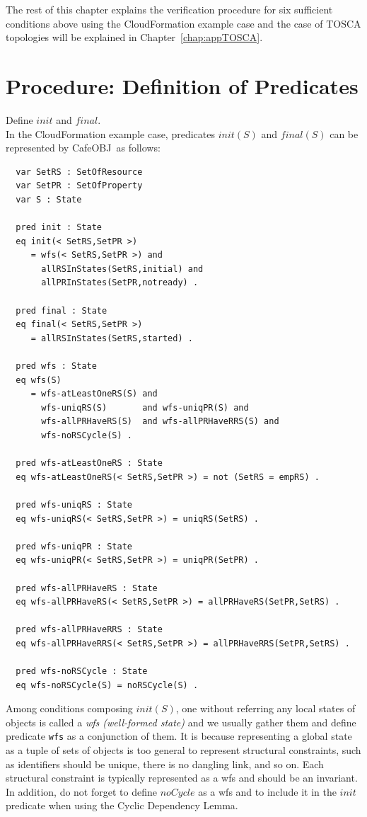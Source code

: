 \documentclass[12pt]{report}
\newcommand{\cafeobj}{{\sf CafeOBJ}~}
\begin{document}
The rest of this chapter explains the verification procedure for six
sufficient conditions above using the CloudFormation example case and
the case of TOSCA topologies will be explained in
Chapter~\ref{chap:appTOSCA}.

\section{Procedure: Definition of Predicates}
\label{sec:support}
 Define $init$ and $final$. \\ In the
CloudFormation example case, predicates $init(S)$ and $final(S)$ can
be represented by \cafeobj as follows:
\small
\begin{verbatim}
  var SetRS : SetOfResource
  var SetPR : SetOfProperty
  var S : State

  pred init : State
  eq init(< SetRS,SetPR >)
     = wfs(< SetRS,SetPR >) and
       allRSInStates(SetRS,initial) and 
       allPRInStates(SetPR,notready) .

  pred final : State
  eq final(< SetRS,SetPR >)
     = allRSInStates(SetRS,started) .

  pred wfs : State
  eq wfs(S)
     = wfs-atLeastOneRS(S) and
       wfs-uniqRS(S)       and wfs-uniqPR(S) and 
       wfs-allPRHaveRS(S)  and wfs-allPRHaveRRS(S) and
       wfs-noRSCycle(S) .

  pred wfs-atLeastOneRS : State
  eq wfs-atLeastOneRS(< SetRS,SetPR >) = not (SetRS = empRS) .

  pred wfs-uniqRS : State
  eq wfs-uniqRS(< SetRS,SetPR >) = uniqRS(SetRS) .

  pred wfs-uniqPR : State
  eq wfs-uniqPR(< SetRS,SetPR >) = uniqPR(SetPR) .

  pred wfs-allPRHaveRS : State
  eq wfs-allPRHaveRS(< SetRS,SetPR >) = allPRHaveRS(SetPR,SetRS) .

  pred wfs-allPRHaveRRS : State
  eq wfs-allPRHaveRRS(< SetRS,SetPR >) = allPRHaveRRS(SetPR,SetRS) .

  pred wfs-noRSCycle : State
  eq wfs-noRSCycle(S) = noRSCycle(S) .
\end{verbatim}
\normalsize
Among conditions composing $init(S)$, one without referring any local
states of objects is called a {\it wfs (well-formed state)} and we
usually gather them and define predicate {\tt wfs} as a conjunction of
them. It is because representing a global state as a tuple of sets of
objects is too general to represent structural constraints, such as
identifiers should be unique, there is no dangling link, and so on. Each
structural constraint is typically represented as a wfs and should be
an invariant. In addition, do not forget to define $noCycle$ as a wfs
and to include it in the $init$ predicate when using the Cyclic
Dependency Lemma.\\
\end{document}
